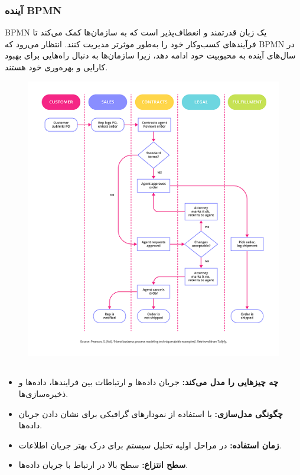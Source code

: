 \subsubsection*{آینده BPMN}

BPMN یک زبان قدرتمند و انعطاف‌پذیر است که به سازمان‌ها کمک می‌کند تا فرآیندهای کسب‌وکار خود را به‌طور موثرتر مدیریت کنند. انتظار می‌رود که BPMN در سال‌های آینده به محبوبیت خود ادامه دهد، زیرا سازمان‌ها به دنبال راه‌هایی برای بهبود کارایی و بهره‌وری خود هستند.


\begin{figure}[H]
	\centering
	\includegraphics{pic5.png}
	\label{fig:label4}
\end{figure}




\subsection*{}
\begin{itemize}
	\item \textbf{چه چیزهایی را مدل می‌کند:} جریان داده‌ها و ارتباطات بین فرایندها، داده‌ها و ذخیره‌سازی‌ها.
	\item \textbf{چگونگی مدل‌سازی:} با استفاده از نمودارهای گرافیکی برای نشان دادن جریان داده‌ها.
	\item \textbf{زمان استفاده:} در مراحل اولیه تحلیل سیستم برای درک بهتر جریان اطلاعات.
	\item \textbf{سطح انتزاع:} سطح بالا در ارتباط با جریان داده‌ها.
\end{itemize}

